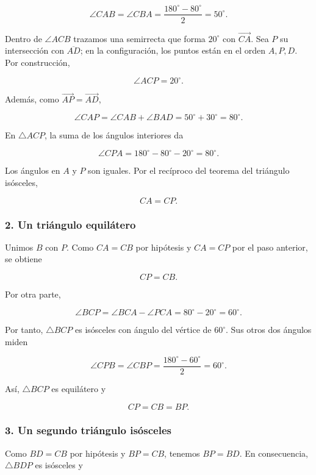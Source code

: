 \documentclass[a4paper,11pt]{article}
\begin{document}
\[\angle CAB=\angle CBA=\frac{180^\circ-80^\circ}{2}=50^\circ.\]

Dentro de \(\angle ACB\) trazamos una semirrecta que forma \(20^\circ\)
con \(\overrightarrow{CA}\). Sea \(P\) su intersección con
\(\overline{AD}\); en la configuración, los puntos están en el orden
\(A,P,D\). Por construcción,

\[\angle ACP=20^\circ.\]

Además, como \(\overrightarrow{AP}=\overrightarrow{AD}\),

\[\angle CAP=\angle CAB+\angle BAD=50^\circ+30^\circ=80^\circ.\]

En \(\triangle ACP\), la suma de los ángulos interiores da

\[\angle CPA=180^\circ-80^\circ-20^\circ=80^\circ.\]

Los ángulos en \(A\) y \(P\) son iguales. Por el recíproco del teorema
del triángulo isósceles,

\[CA=CP.\]

\hypertarget{un-triuxe1ngulo-equiluxe1tero}{%
\subsubsection*{2. Un triángulo
equilátero}\label{un-triuxe1ngulo-equiluxe1tero}}

Unimos \(B\) con \(P\). Como \(CA=CB\) por hipótesis y \(CA=CP\) por el
paso anterior, se obtiene

\[CP=CB.\]

Por otra parte,

\[\angle BCP=\angle BCA-\angle PCA=80^\circ-20^\circ=60^\circ.\]

Por tanto, \(\triangle BCP\) es isósceles con ángulo del vértice de
\(60^\circ\). Sus otros dos ángulos miden

\[\angle CPB=\angle CBP=\frac{180^\circ-60^\circ}{2}=60^\circ.\]

Así, \(\triangle BCP\) es equilátero y

\[CP=CB=BP.\]

\hypertarget{un-segundo-triuxe1ngulo-isuxf3sceles}{%
\subsubsection*{3. Un segundo triángulo
isósceles}\label{un-segundo-triuxe1ngulo-isuxf3sceles}}

Como \(BD=CB\) por hipótesis y \(BP=CB\), tenemos \(BP=BD\). En
consecuencia, \(\triangle BDP\) es isósceles y
\end{document}
